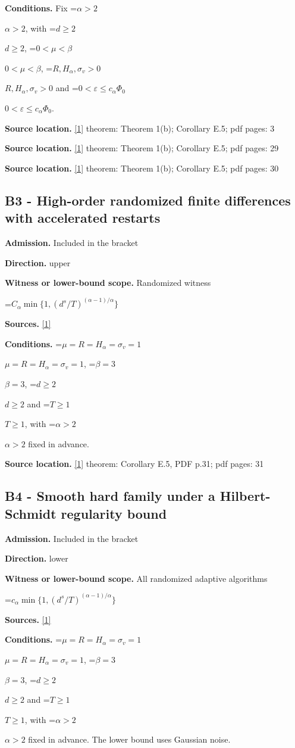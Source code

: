 \documentclass[10pt,a4paper]{article}
\newcommand{\AtlasMath}[1]{\par\begingroup\centering\setbox0=\hbox{$\displaystyle #1$}\ifdim\wd0>1.4\linewidth\typeout{ATLAS WIDE FORMULA: \the\wd0}\fi\ifdim\wd0>\linewidth\resizebox{\linewidth}{!}{\box0}\else\box0\fi\par\endgroup}
\newcommand{\AtlasInlineMath}[1]{\begingroup\setbox0=\hbox{$#1$}\ifdim\wd0>.4\linewidth\endgroup\AtlasMath{#1}\else\endgroup$#1$\fi}
\begin{document}
\textbf{Conditions.} Fix \AtlasInlineMath{\alpha>2}, with \AtlasInlineMath{d\ge2}, \AtlasInlineMath{0<\mu<\beta}, \AtlasInlineMath{R,H_\alpha,\sigma_v>0} and \AtlasInlineMath{0<\varepsilon\le c_\alpha\Phi_0}.

\textbf{Source location.} \href{https://arxiv.org/pdf/2610.05517v2}{[1]} theorem: Theorem 1(b); Corollary E.5; pdf pages: 3

\textbf{Source location.} \href{https://arxiv.org/pdf/2610.05517v2}{[1]} theorem: Theorem 1(b); Corollary E.5; pdf pages: 29

\textbf{Source location.} \href{https://arxiv.org/pdf/2610.05517v2}{[1]} theorem: Theorem 1(b); Corollary E.5; pdf pages: 30

\subsection{B3 - High-order randomized finite differences with accelerated restarts}
\textbf{Admission.} Included in the bracket

\textbf{Direction.} upper

\textbf{Witness or lower-bound scope.} Randomized witness

\AtlasMath{C_\alpha\min\{1,(d^s/T)^{(\alpha-1)/\alpha}\}}
\textbf{Sources.} \href{https://arxiv.org/pdf/2610.05517v2}{[1]}

\textbf{Conditions.} \AtlasInlineMath{\mu=R=H_\alpha=\sigma_v=1}, \AtlasInlineMath{\beta=3}, \AtlasInlineMath{d\ge2} and \AtlasInlineMath{T\ge1}, with \AtlasInlineMath{\alpha>2} fixed in advance.

\textbf{Source location.} \href{https://arxiv.org/pdf/2610.05517v2}{[1]} theorem: Corollary E.5, PDF p.31; pdf pages: 31

\subsection{B4 - Smooth hard family under a Hilbert-Schmidt regularity bound}
\textbf{Admission.} Included in the bracket

\textbf{Direction.} lower

\textbf{Witness or lower-bound scope.} All randomized adaptive algorithms

\AtlasMath{c_\alpha\min\{1,(d^s/T)^{(\alpha-1)/\alpha}\}}
\textbf{Sources.} \href{https://arxiv.org/pdf/2610.05517v2}{[1]}

\textbf{Conditions.} \AtlasInlineMath{\mu=R=H_\alpha=\sigma_v=1}, \AtlasInlineMath{\beta=3}, \AtlasInlineMath{d\ge2} and \AtlasInlineMath{T\ge1}, with \AtlasInlineMath{\alpha>2} fixed in advance. The lower bound uses Gaussian noise.
\end{document}
